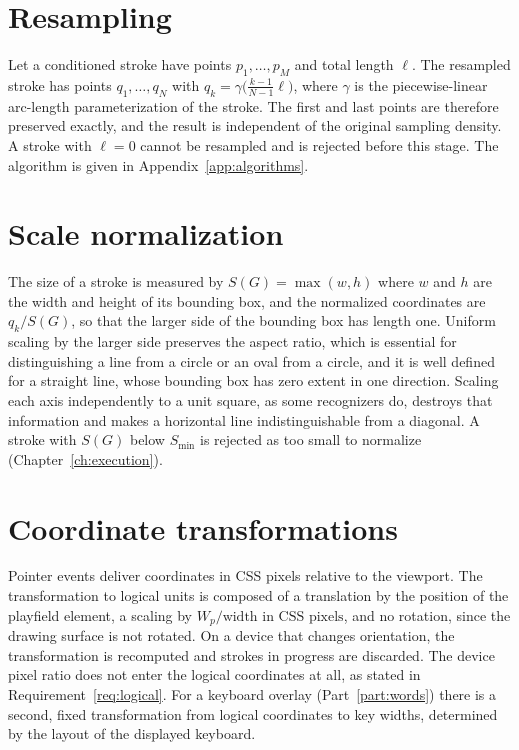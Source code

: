 \section{Resampling}

Let a conditioned stroke have points $p_1,\dots,p_M$ and total length $\ell$. The resampled stroke has points $q_1,\dots,q_N$ with $q_k=\gamma\bigl(\tfrac{k-1}{N-1}\ell\bigr)$, where $\gamma$ is the piecewise-linear arc-length parameterization of the stroke. The first and last points are therefore preserved exactly, and the result is independent of the original sampling density. A stroke with $\ell=0$ cannot be resampled and is rejected before this stage. The algorithm is given in Appendix~\ref{app:algorithms}.

\section{Scale normalization}

The size of a stroke is measured by $S(G)=\max(w,h)$ where $w$ and $h$ are the width and height of its bounding box, and the normalized coordinates are $q_k/S(G)$, so that the larger side of the bounding box has length one. Uniform scaling by the larger side preserves the aspect ratio, which is essential for distinguishing a line from a circle or an oval from a circle, and it is well defined for a straight line, whose bounding box has zero extent in one direction. Scaling each axis independently to a unit square, as some recognizers do, destroys that information and makes a horizontal line indistinguishable from a diagonal. A stroke with $S(G)$ below $S_{\min}$ is rejected as too small to normalize (Chapter~\ref{ch:execution}).\evS

\section{Coordinate transformations}

Pointer events deliver coordinates in CSS pixels relative to the viewport. The transformation to logical units is composed of a translation by the position of the playfield element, a scaling by $W_p/\text{width in CSS pixels}$, and no rotation, since the drawing surface is not rotated. On a device that changes orientation, the transformation is recomputed and strokes in progress are discarded. The device pixel ratio does not enter the logical coordinates at all, as stated in Requirement~\ref{req:logical}. For a keyboard overlay (Part~\ref{part:words}) there is a second, fixed transformation from logical coordinates to key widths, determined by the layout of the displayed keyboard.

